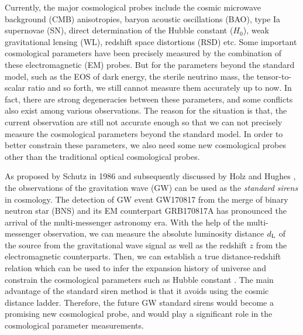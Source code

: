 \documentclass[aps,prd,nofootinbib,amsmath,amssymb,superscriptaddress,twocolumn,10pt]{revtex4}%
\begin{document}
Currently, the major cosmological probes include the cosmic microwave background (CMB) anisotropies, baryon acoustic oscillations (BAO), type Ia supernovae (SN), direct determination of the Hubble constant ($H_{0}$), weak gravitational lensing (WL), redshift space distortions (RSD) etc. Some important cosmological parameters have been precisely measured by the combination of these electromagnetic (EM) probes. But for the parameters beyond the standard model, such as the EOS of dark energy, the sterile neutrino mass, the tensor-to-scalar ratio and so forth, we still cannot measure them accurately up to now. In fact, there are strong degeneracies between these parameters, and some conflicts also exist among various observations. The reason for the situation is that, the current observation are still not accurate enough so that we can not precisely measure the cosmological parameters beyond the standard model. In order to better constrain these parameters, we also need some new cosmological probes other than the traditional optical cosmological probes.

As proposed by Schutz in 1986 \cite{Schutz:1986gp} and subsequently discussed by Holz and Hughes \cite{Holz:2005df}, the observations of the gravitation wave (GW) can be used as the \textit{standard sirens} in cosmology.
The detection of GW event GW170817 from the merge of binary neutron star (BNS) and its EM counterpart GRB170817A has pronounced the arrival of the multi-messenger astronomy era. With the help of the multi-messenger observation, we can measure the absolute luminosity distance $d_{\rm L}$ of the source from the gravitational wave signal as well as the redshift $z$ from the electromagnetic counterparts. Then, we can establish a true distance-redshift relation which can be used to infer the expansion history of universe and constrain the cosmological parameters such as Hubble constant \cite{Abbott:2017xzu}. The main advantage of the standard siren method is that it avoids using the cosmic distance ladder. Therefore, the future GW standard sirens would become a promising new cosmological probe, and would play a significant role in the cosmological parameter measurements.
\end{document}
